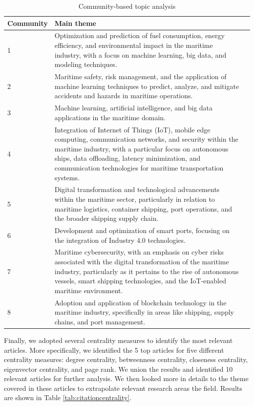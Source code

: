 \documentclass[a4paper, review, endfloat, authoryear]{elsarticle}
\begin{document}
	\begin{table}[h]
		\centering
		\caption{Community-based topic analysis}
		\begin{tabular}{l l c}
			\hline
			Community & Main theme \\
			\hline
			1 & Optimization and prediction of fuel consumption, energy efficiency, and environmental impact in the maritime industry, with a focus on machine learning, big data, and modeling techniques.\\
			2 & Maritime safety, risk management, and the application of machine learning techniques to predict, analyze, and mitigate accidents and hazards in maritime operations. \\
			3 & Machine learning, artificial intelligence, and big data applications in the maritime domain.\\
			4 & Integration of Internet of Things (IoT), mobile edge computing, communication networks, and security within the maritime industry, with a particular focus on autonomous ships, data offloading, latency minimization, and communication technologies for maritime transportation systems.\\
			5 & Digital transformation and technological advancements within the maritime sector, particularly in relation to maritime logistics, container shipping, port operations, and the broader shipping supply chain.\\
			6 & Development and optimization of smart ports, focusing on the integration of Industry 4.0 technologies.\\
			7 & Maritime cybersecurity, with an emphasis on cyber risks associated with the digital transformation of the maritime industry, particularly as it pertains to the rise of autonomous vessels, smart shipping technologies, and the IoT-enabled maritime environment.\\
			8 & Adoption and application of blockchain technology in the maritime industry, specifically in areas like shipping, supply chains, and port management.\\
			\hline
		\end{tabular}
		\label{tab:citationthemes}
	\end{table}
	
	Finally, we adopted several centrality measures to identify the most relevant articles. More specifically, we identified the 5 top articles for five different centrality measures: degree centrality, betweenness centrality, closeness centrality, eigenvector centrality, and page rank. We union the results and identified 10 relevant articles for further analysis. We then looked more in details to the theme covered in these articles to extrapolate relevant research areas the field. Results are shown in Table \ref{tab:citationcentrality}.
	
\end{document}
